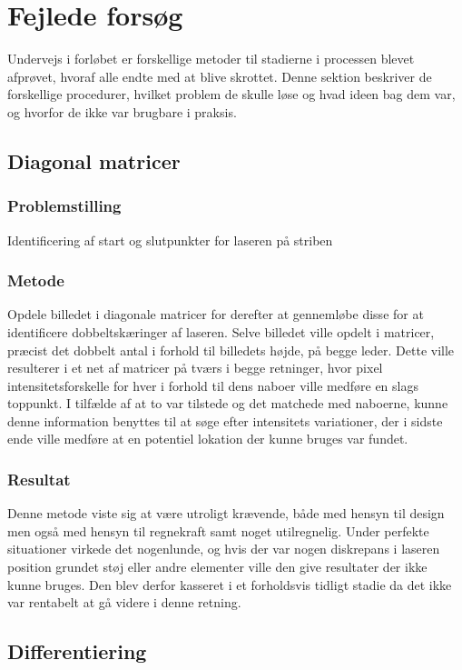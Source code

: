 \section{Fejlede forsøg}
Undervejs i forløbet er forskellige metoder til stadierne i processen blevet afprøvet, hvoraf alle endte med at blive skrottet. Denne sektion beskriver de forskellige procedurer, hvilket problem de skulle løse og hvad ideen bag dem var, og hvorfor de ikke var brugbare i praksis.

\subsection{Diagonal matricer}

\subsubsection{Problemstilling}
Identificering af start og slutpunkter for laseren på striben

\subsubsection{Metode}
Opdele billedet i diagonale matricer for derefter at gennemløbe disse for at identificere dobbeltskæringer af laseren. Selve billedet ville opdelt i matricer, præcist det dobbelt antal i forhold til billedets højde, på begge leder. Dette ville resulterer i et net af matricer på tværs i begge retninger, hvor pixel intensitetsforskelle for hver i forhold til dens naboer ville medføre en slags toppunkt. I tilfælde af at to var tilstede og det matchede med naboerne, kunne denne information benyttes til at søge efter intensitets variationer, der i sidste ende ville medføre at en potentiel lokation der kunne bruges var fundet.

\subsubsection{Resultat}
Denne metode viste sig at være utroligt krævende, både med hensyn til design men også med hensyn til regnekraft samt noget utilregnelig. Under perfekte situationer virkede det nogenlunde, og hvis der var nogen diskrepans i laseren position grundet støj eller andre elementer ville den give resultater der ikke kunne bruges. Den blev derfor kasseret i et forholdsvis tidligt stadie da det ikke var rentabelt at gå videre i denne retning.

\subsection{Differentiering}

